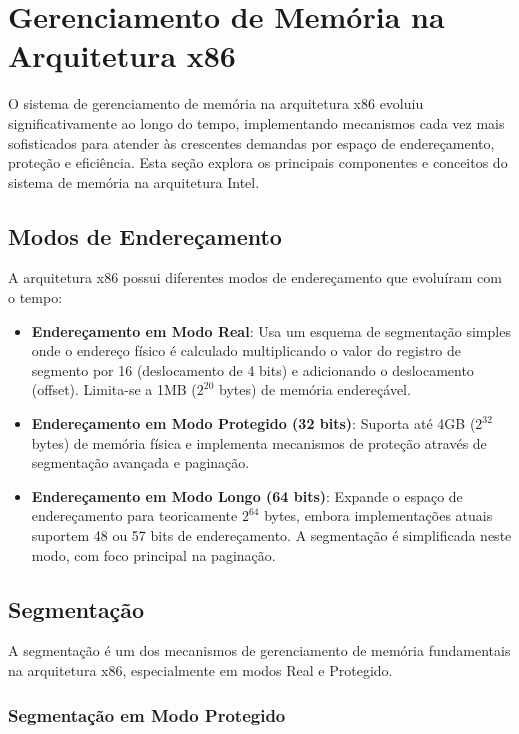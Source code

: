 \section{Gerenciamento de Memória na Arquitetura x86}
\label{sec:b02_memoria}

O sistema de gerenciamento de memória na arquitetura x86 evoluiu significativamente ao longo do tempo, implementando mecanismos cada vez mais sofisticados para atender às crescentes demandas por espaço de endereçamento, proteção e eficiência. Esta seção explora os principais componentes e conceitos do sistema de memória na arquitetura Intel.

\subsection{Modos de Endereçamento}
\label{subsec:enderecamento}

A arquitetura x86 possui diferentes modos de endereçamento que evoluíram com o tempo:

\begin{itemize}
    \item \textbf{Endereçamento em Modo Real}: Usa um esquema de segmentação simples onde o endereço físico é calculado multiplicando o valor do registro de segmento por 16 (deslocamento de 4 bits) e adicionando o deslocamento (offset). Limita-se a 1MB ($2^{20}$ bytes) de memória endereçável.

    \item \textbf{Endereçamento em Modo Protegido (32 bits)}: Suporta até 4GB ($2^{32}$ bytes) de memória física e implementa mecanismos de proteção através de segmentação avançada e paginação.

    \item \textbf{Endereçamento em Modo Longo (64 bits)}: Expande o espaço de endereçamento para teoricamente $2^{64}$ bytes, embora implementações atuais suportem 48 ou 57 bits de endereçamento. A segmentação é simplificada neste modo, com foco principal na paginação.
\end{itemize}

\subsection{Segmentação}
\label{subsec:segmentacao}

A segmentação é um dos mecanismos de gerenciamento de memória fundamentais na arquitetura x86, especialmente em modos Real e Protegido.

\subsubsection{Segmentação em Modo Protegido}

